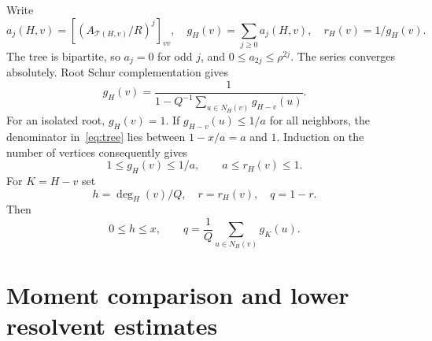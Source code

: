 \documentclass[11pt]{article}
\numberwithin{equation}{section}
\theoremstyle{remark}
\begin{document}
Write
\[
 a_j(H,v)=
 \left[\left(A_{\mathcal T(H,v)}/R\right)^j\right]_{vv},
 \quad
 g_H(v)=\sum_{j\ge0}a_j(H,v),
 \quad r_H(v)=1/g_H(v).
\]
The tree is bipartite, so $a_j=0$ for odd $j$, and
$0\le a_{2j}\le\rho^{2j}$. The series converges absolutely.
Root Schur complementation gives
\begin{equation}\label{eq:tree}
 g_H(v)=
 \frac1{1-Q^{-1}\sum_{u\in N_H(v)}g_{H-v}(u)}.
\end{equation}
For an isolated root, $g_H(v)=1$. If
$g_{H-v}(u)\le1/a$ for all neighbors, the denominator
in~\eqref{eq:tree} lies between $1-x/a=a$ and $1$.
Induction on the number of vertices consequently gives
\begin{equation}\label{eq:r-range}
 1\le g_H(v)\le1/a,\qquad a\le r_H(v)\le1.
\end{equation}
For $K=H-v$ set
\[
 h=\deg_H(v)/Q,\quad r=r_H(v),\quad q=1-r.
\]
Then
\begin{equation}\label{eq:q-reference}
 0\le h\le x,\qquad
 q=\frac1Q\sum_{u\in N_H(v)}g_K(u).
\end{equation}

\section{Moment comparison and lower resolvent estimates}\label{sec:moments}
\end{document}
